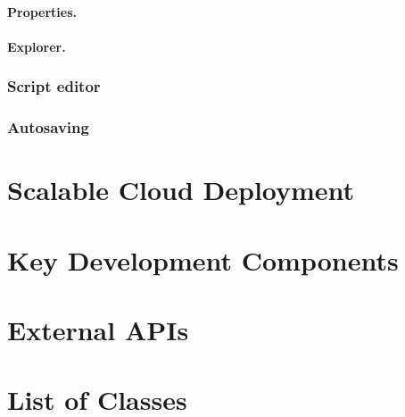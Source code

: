 	\paragraph{Properties.}
	\paragraph{Explorer.}
	\subsubsection{Script editor}
	\subsubsection{Autosaving}



\section{Scalable Cloud Deployment}

\section{Key Development Components}

\section{External APIs}

\section{List of Classes}
